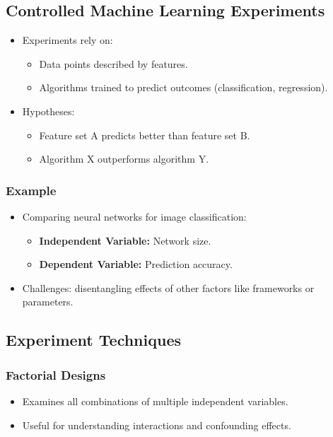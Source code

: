 \subsection{Controlled Machine Learning Experiments}
\begin{itemize}
    \item Experiments rely on:
    \begin{itemize}
        \item Data points described by features.
        \item Algorithms trained to predict outcomes (classification, regression).
    \end{itemize}
    \item Hypotheses:
    \begin{itemize}
        \item Feature set A predicts better than feature set B.
        \item Algorithm X outperforms algorithm Y.
    \end{itemize}
\end{itemize}

\subsubsection{Example}
\begin{itemize}
    \item Comparing neural networks for image classification:
    \begin{itemize}
        \item \textbf{Independent Variable:} Network size.
        \item \textbf{Dependent Variable:} Prediction accuracy.
    \end{itemize}
    \item Challenges: disentangling effects of other factors like frameworks or parameters.
\end{itemize}

\subsection{Experiment Techniques}
\subsubsection{Factorial Designs}
\begin{itemize}
    \item Examines all combinations of multiple independent variables.
    \item Useful for understanding interactions and confounding effects.
\end{itemize}

